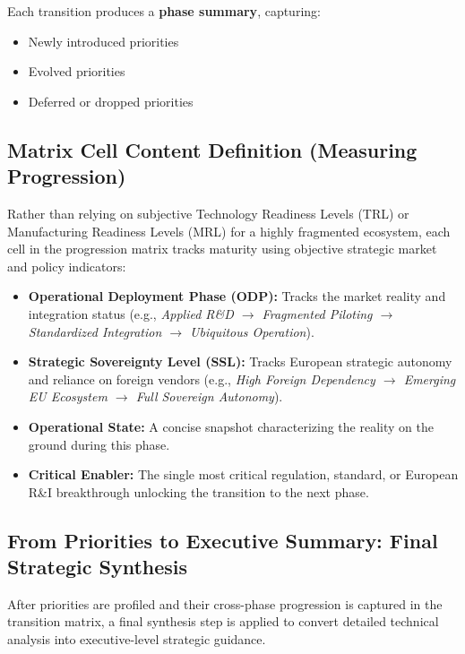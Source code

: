 \documentclass{ieeeaccess}
\begin{document}
Each transition produces a \textbf{phase summary}, capturing:

\begin{itemize}
    \item Newly introduced priorities
    \item Evolved priorities
    \item Deferred or dropped priorities
\end{itemize}

\subsection*{Matrix Cell Content Definition (Measuring Progression)}
Rather than relying on subjective Technology Readiness Levels (TRL) or Manufacturing Readiness Levels (MRL) for a highly fragmented ecosystem, each cell in the progression matrix tracks maturity using objective strategic market and policy indicators:

\begin{itemize}
    \item \textbf{Operational Deployment Phase (ODP):} Tracks the market reality and integration status (e.g., \textit{Applied R\&D $\rightarrow$ Fragmented Piloting $\rightarrow$ Standardized Integration $\rightarrow$ Ubiquitous Operation}).
    \item \textbf{Strategic Sovereignty Level (SSL):} Tracks European strategic autonomy and reliance on foreign vendors (e.g., \textit{High Foreign Dependency $\rightarrow$ Emerging EU Ecosystem $\rightarrow$ Full Sovereign Autonomy}).
    \item \textbf{Operational State:} A concise snapshot characterizing the reality on the ground during this phase.
    \item \textbf{Critical Enabler:} The single most critical regulation, standard, or European R\&I breakthrough unlocking the transition to the next phase.
\end{itemize}

\subsection{From Priorities to Executive Summary: Final Strategic Synthesis}

After priorities are profiled and their cross-phase progression is captured in the transition matrix, a final synthesis step is applied to convert detailed technical analysis into executive-level strategic guidance.
\end{document}
